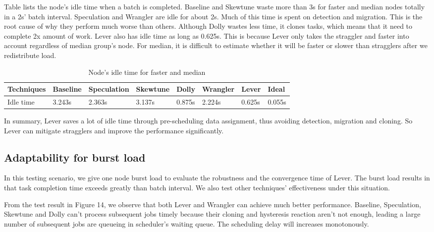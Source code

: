 \documentclass[10pt,conference,compsocconf,letterpaper]{IEEEtran}
\begin{document}
  Table \uppercase\expandafter{} lists the node's idle time when a batch is completed. Baseline and Skewtune waste more than 3s for faster and median nodes totally in a 2s' batch interval. Speculation and Wrangler are idle for about 2s. Much of this time is spent on detection and migration. This is the root cause of why they perform much worse than others. Although Dolly wastes less time, it clones tasks, which means that it need to complete 2x amount of work. Lever also has idle time as long as 0.625s. This is because Lever only takes the straggler and faster into account regardless of median group's node. For median, it is difficult to estimate whether it will be faster or slower than stragglers after we redistribute load.
  \begin{table}[htbp]
    \small
    \centering
    \caption{Node's idle time for faster and median}
    \begin{threeparttable}
    \centering
      \begin{tabular}{|p{1.4cm}|p{1.2cm}|p{1.5cm}|p{1.2cm}|p{0.9cm}|p{1.2cm}|p{0.9cm}|p{0.9cm}|}
        \hline
        Techniques & Baseline & Speculation & Skewtune & Dolly & Wrangler & Lever & Ideal \\
        \hline
        Idle time & 3.243s & 2.363s & 3.137s & 0.875s & 2.224s & 0.625s & 0.055s \\
        \hline
      \end{tabular}
    \end{threeparttable}
    \label{Table3}
  \end{table}

  In summary, Lever saves a lot of idle time through pre-scheduling data assignment, thus avoiding detection, migration and cloning. So Lever can mitigate stragglers and improve the performance significantly.

\subsection{Adaptability for burst load}

  In this testing scenario, we give one node burst load to evaluate the robustness and the convergence time of Lever. The burst load results in that task completion time exceeds greatly than batch interval. We also test other techniques' effectiveness under this situation.

  From the test result in Figure 14, we observe that both Lever and Wrangler can achieve much better performance. Baseline, Speculation, Skewtune and Dolly can't process subsequent jobs timely because their cloning and hysteresis reaction aren't not enough, leading a large number of subsequent jobs are queueing in scheduler's waiting queue. The scheduling delay will increases monotonously.
\end{document}
